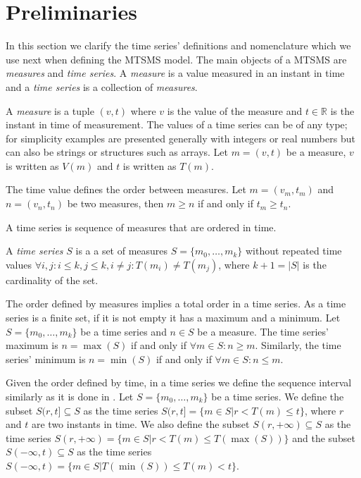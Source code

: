 \section{Preliminaries}
\label{sec:model:preliminaries}

In this section we clarify the time series' definitions and
nomenclature which we use next when defining the MTSMS model.  The
main objects of a MTSMS are \emph{measures} and \emph{time series}. A
\emph{measure} is a value measured in an instant in time and a
\emph{time series} is a collection of \emph{measures}.

A \emph{measure} is a tuple $(v,t)$ where $v$ is the value of the
measure and $t \in \mathbb{R}$ is the instant in time of measurement.
The values of a time series can be of any type; for simplicity
examples are presented generally with integers or real numbers but can
also be strings or structures such as arrays.  Let $m = (v,t)$ be a
measure, $v$ is written as $V(m)$ and $t$ is written as $T(m)$.


The time value defines the order between measures.  Let $m = (v_m,
t_m)$ and $n = (v_n, t_n)$ be two measures, then $m\geq n$ if and only
if $t_m\geq t_n$.

A time series is sequence of measures that are ordered in time. 
\begin{definition}
  A \emph{time series} $S$ is a a set of measures $S = \{m_0, \ldots,
  m_k\}$ without repeated time values $\forall i,j: i\leq k, j\leq k,
  i\neq j : T(m_i)\neq T(m_j)$, where $k+1=|S|$ is the cardinality of
  the set.
\end{definition}

The order defined by measures implies a total order in a time
series. As a time series is a finite set, if it is not empty it has a
maximum and a minimum.  Let $S=\{m_0,\ldots,m_k\}$ be a time series
and $n\in S$ be a measure. The time series' maximum is $n=\max(S)$ if
and only if $\forall m \in S: n \geq m $.  Similarly, the time series'
minimum is $n=\min(S)$ if and only if $\forall m \in S: n \leq m$.

Given the order defined by time, in a time series we define the
sequence interval similarly as it is done in
\cite{last:keogh,last:hetland}.  Let $S=\{m_0, \ldots, m_k\}$ be a
time series. We define the subset $S(r,t] \subseteq S$ as the time
series $S(r,t]=\{m\in S | r<T(m)\leq t\}$, where $r$ and $t$ are two
instants in time.  We also define the subset $S(r,+\infty)\subseteq S$
as the time series $S(r,+\infty) = \{m\in S | r< T(m) \leq
T(\max(S))\}$ and the subset $S(-\infty,t)\subseteq S$ as the time
series $S(-\infty,t) = \{m\in S | T(\min(S))\leq T(m) < t\}$.


